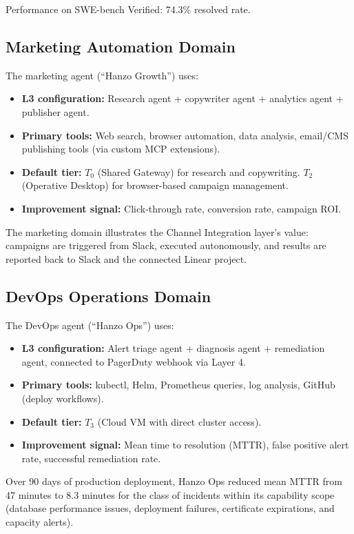 \documentclass[11pt]{article}
\begin{document}
Performance on SWE-bench Verified: 74.3\% resolved rate.

\subsection{Marketing Automation Domain}

The marketing agent (``Hanzo Growth'') uses:
\begin{itemize}[leftmargin=1.5em]
    \item \textbf{L3 configuration:} Research agent + copywriter agent +
          analytics agent + publisher agent.
    \item \textbf{Primary tools:} Web search, browser automation, data
          analysis, email/CMS publishing tools (via custom MCP extensions).
    \item \textbf{Default tier:} $T_0$ (Shared Gateway) for research and
          copywriting. $T_2$ (Operative Desktop) for browser-based campaign
          management.
    \item \textbf{Improvement signal:} Click-through rate, conversion rate,
          campaign ROI.
\end{itemize}

The marketing domain illustrates the Channel Integration layer's value:
campaigns are triggered from Slack, executed autonomously, and results are
reported back to Slack and the connected Linear project.

\subsection{DevOps Operations Domain}

The DevOps agent (``Hanzo Ops'') uses:
\begin{itemize}[leftmargin=1.5em]
    \item \textbf{L3 configuration:} Alert triage agent + diagnosis agent +
          remediation agent, connected to PagerDuty webhook via Layer 4.
    \item \textbf{Primary tools:} kubectl, Helm, Prometheus queries, log
          analysis, GitHub (deploy workflows).
    \item \textbf{Default tier:} $T_3$ (Cloud VM with direct cluster access).
    \item \textbf{Improvement signal:} Mean time to resolution (MTTR),
          false positive alert rate, successful remediation rate.
\end{itemize}

Over 90 days of production deployment, Hanzo Ops reduced mean MTTR from 47
minutes to 8.3 minutes for the class of incidents within its capability scope
(database performance issues, deployment failures, certificate expirations,
and capacity alerts).
\end{document}
